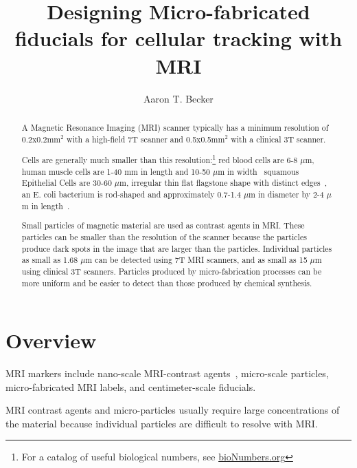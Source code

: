 \documentclass[letterpaper, 10 pt, conference]{ieeeconf}
\begin{document}
\author{Aaron T. Becker}
\title{Designing Micro-fabricated fiducials for cellular tracking with MRI}
\maketitle

\begin{abstract}
A Magnetic Resonance Imaging (MRI) scanner typically has a minimum resolution of 0.2x0.2mm$^2$ with a high-field 7T scanner and 0.5x0.5mm$^2$ with a clinical 3T scanner\cite{olamaei2011accurate}.

Cells are generally much smaller than this resolution:\footnote{For a catalog of useful biological numbers, see \url{bioNumbers.org}}
red blood cells are 6-8 $\mu$m, 
human muscle cells are 1-40 mm in length and 10-50 $\mu$m in width~\cite{lodish2000muscle}
squamous Epithelial Cells are 30-60 $\mu$m, irregular thin flat flagstone shape with distinct edges~\cite{brunzel2004fundamentals}, %
an E. coli bacterium is rod-shaped and approximately 0.7-1.4 $\mu$m in diameter by 2-4 $\mu$m in length~\cite{zaritsky1978chromosome}.

Small particles of magnetic material are used as contrast agents in MRI. 
These particles can be smaller than the resolution of the scanner because the particles produce dark spots in the image that are larger than the particles.  Individual particles as small as 1.68 $\mu$m can be detected using 7T MRI scanners, and as small as 15 $\mu$m using clinical 3T scanners. Particles produced by micro-fabrication processes can be more uniform and be easier to detect than those produced by chemical synthesis.



\end{abstract}

\section{Overview}

MRI markers include nano-scale MRI-contrast agents~\cite{carroll2010experimental}, micro-scale particles, micro-fabricated MRI labels, and centimeter-scale fiducials. 

MRI contrast agents and micro-particles usually require large concentrations of the material because individual particles are difficult to resolve with MRI.
\end{document}

